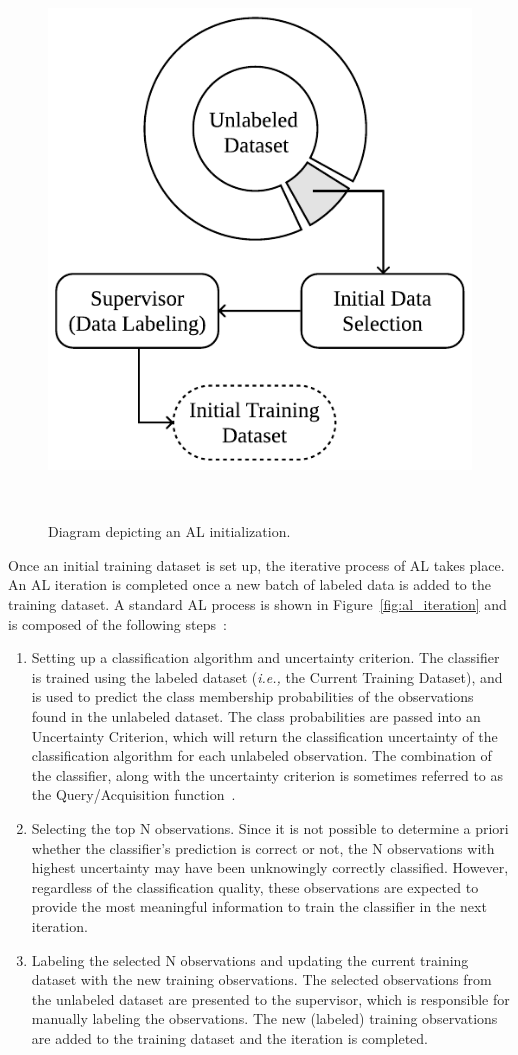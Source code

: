 \documentclass[preprint, 12pt]{elsarticle}
\begin{document}
\begin{figure}[H]
	\centering
	\includegraphics[width=.45\linewidth]{../analysis/al_initialization}
    \caption{%
        Diagram depicting an AL initialization.
    }~\label{fig:al_initialization}
\end{figure}

Once an initial training dataset is set up, the iterative process of AL takes
place. An AL iteration is completed once a new batch of labeled data is added
to the training dataset. A standard AL process is shown in
Figure~\ref{fig:al_iteration} and is composed of the following
steps~\cite{Su2020, Sverchkov2017}:

\begin{enumerate}

    \item Setting up a classification algorithm and uncertainty criterion. The
        classifier is trained using the labeled dataset (\textit{i.e.,} the
        Current Training Dataset), and is used to predict the class membership
        probabilities of the observations found in the unlabeled dataset. The
        class probabilities are passed into an Uncertainty Criterion, which
        will return the classification uncertainty of the classification
        algorithm for each unlabeled observation. The combination of the
        classifier, along with the uncertainty criterion is sometimes referred
        to as the Query/Acquisition function~\cite{Rosario2020}.

    \item Selecting the top N observations. Since it is not possible to
        determine a priori whether the classifier's prediction is correct or
        not, the N observations with highest uncertainty may have been
        unknowingly correctly classified. However, regardless of the
        classification quality, these observations are expected to provide the
        most meaningful information to train the classifier in the next
        iteration.

    \item Labeling the selected N observations and updating the current
        training dataset with the new training observations. The selected
        observations from the unlabeled dataset are presented to the
        supervisor, which is responsible for manually labeling the
        observations. The new (labeled) training observations are added to the
        training dataset and the iteration is completed.

\end{enumerate}
\end{document}
